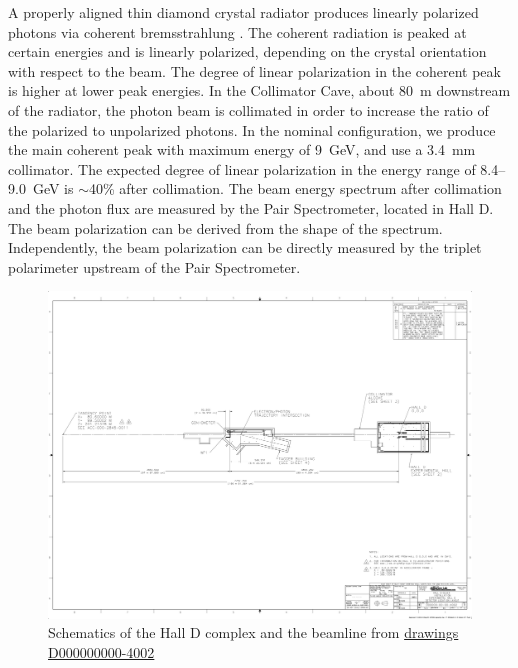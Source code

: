 A properly aligned thin diamond crystal radiator produces linearly polarized photons via coherent bremsstrahlung \cite{timm1969}.
The coherent radiation is peaked at certain energies and is linearly polarized, depending on the crystal orientation with respect to the beam.
The degree of linear polarization in the coherent peak is higher at lower peak energies.
In the Collimator Cave, about 80~m downstream of the radiator, the photon beam is collimated in order to increase the ratio of the polarized to unpolarized photons.  In the nominal \GX{} configuration, we produce the main coherent peak
with maximum energy of 9~GeV, and use a 3.4~mm collimator.
The expected degree of linear polarization in the energy range of
8.4--9.0~GeV is $\sim$40\% after collimation. The beam energy spectrum
after collimation and the photon flux are measured by the Pair
Spectrometer, located in Hall D. The beam polarization can be derived
from the shape of the spectrum. Independently, the beam polarization
can be directly measured by the triplet polarimeter upstream of the
Pair Spectrometer.
 

\begin{figure}[h]
\begin{center}
   \includegraphics[page=1,viewport=1001 991 3020 1700,clip,angle=0,width=0.98\linewidth]{figures/D000000000-4002_RevB}
\end{center}
\caption{Schematics of the Hall D complex and the beamline 
         from \href{https://misportal.jlab.org/jlabDocs/document.seam?id=80930}{drawings D000000000-4002}
        }
\label{fig:beam:halld-tot} 
\end{figure}

